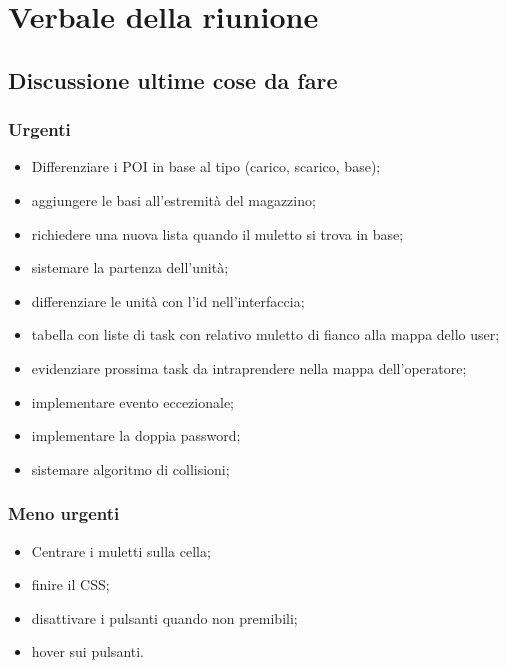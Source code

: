 \section{Verbale della riunione}

\subsection{Discussione ultime cose da fare}

\subsubsection{Urgenti}

\begin{itemize}
	\item Differenziare i POI in base al tipo (carico, scarico, base);
	\item aggiungere le basi all'estremità del magazzino;
	\item richiedere una nuova lista quando il muletto si trova in base;
	\item sistemare la partenza dell'unità;
	\item differenziare le unità con l'id nell'interfaccia;
	\item tabella con liste di task con relativo muletto di fianco alla mappa dello user;
	\item evidenziare prossima task da intraprendere nella mappa dell'operatore;
	\item implementare evento eccezionale;
	\item implementare la doppia password;
	\item sistemare algoritmo di collisioni;
	
\end{itemize}
\subsubsection{Meno urgenti}

\begin{itemize}
	\item Centrare i muletti sulla cella;
	\item finire il CSS;
	\item disattivare i pulsanti quando non premibili;
	\item hover sui pulsanti.
\end{itemize}